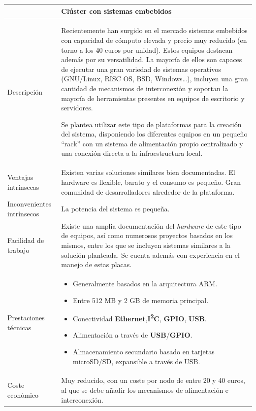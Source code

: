 \begin{table}
\begin{tabular}{|p{2.3cm}|p{12cm}|}
\hline
&\textbf{Clúster con sistemas embebidos}\\
\hline
Descripción&Recientemente han surgido en el mercado sistemas embebidos con capacidad de cómputo elevada y precio muy reducido (en torno a los 40 euros por unidad). Estos equipos destacan además por su versatilidad. La mayoría de ellos son capaces de ejecutar una gran variedad de sistemas operativos (GNU/Linux, RISC OS, BSD, Windows\dots), incluyen una gran cantidad de mecanismos de interconexión y soportan la mayoría de herramientas presentes en equipos de escritorio y servidores.

Se plantea utilizar este tipo de plataformas para la creación del sistema, disponiendo los diferentes equipos en un pequeño ``rack'' con un sistema de alimentación propio centralizado y una conexión directa a la infraestructura local.\\
\hline
Ventajas intrínsecas&Existen varias soluciones similares bien documentadas.
El hardware es flexible, barato y el consumo es pequeño.
Gran comunidad de desarrolladores alrededor de la plataforma.\\
\hline
Inconvenientes intrínsecos&La potencia del sistema es pequeña.\\
\hline
Facilidad de trabajo&Existe una amplia documentación del \textit{hardware} de este tipo de equipos, así como numerosos proyectos basados en los mismos, entre los que se incluyen sistemas similares a la solución planteada. Se cuenta además con experiencia en el manejo de estas placas.\\
\hline
Prestaciones técnicas&
\begin{itemize}[noitemsep]
  \item Generalmente basados en la arquitectura ARM.
  \item Entre 512 MB y 2 GB de memoria principal.
  \item Conectividad \textbf{Ethernet},\textbf{I\textsuperscript{2}C}, \textbf{GPIO}, \textbf{USB}.
  \item Alimentación a través de \textbf{USB}/\textbf{GPIO}.
  \item Almacenamiento secundario basado en tarjetas microSD/SD, expansible a través de USB.
\end{itemize}\\
\hline
Coste económico&Muy reducido, con un coste por nodo de entre 20 y 40 euros, al que se debe añadir los mecanismos de alimentación e interconexión.\\

\end{tabular}
\end{table}
